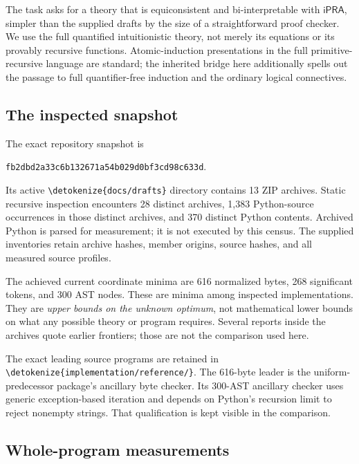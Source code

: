 \documentclass[11pt,letterpaper]{article}
\theoremstyle{definition}\newtheorem{definition}[theorem]{Definition}
\theoremstyle{remark}\newtheorem{remark}[theorem]{Remark}
\newcommand{\ipra}{\ensuremath{\mathsf{iPRA}}}
\newcommand{\file}[1]{\expandafter\nolinkurl\expandafter{\detokenize{#1}}}
\begin{document}
The task asks for a theory that is equiconsistent and bi-interpretable with
\ipra, simpler than the supplied drafts by the size of a straightforward
proof checker. We use the full quantified intuitionistic theory, not merely
its equations or its provably recursive functions. Atomic-induction
presentations in the full primitive-recursive language are standard;
the inherited bridge here additionally spells out the passage to full
quantifier-free induction and the ordinary logical connectives.\cite{salehi}

\subsection{The inspected snapshot}

The exact repository snapshot is
\begin{center}\small\texttt{fb2dbd2a33c6b132671a54b029d0bf3cd98c633d}.\end{center}
Its active \file{docs/drafts} directory contains 13 ZIP archives. Static
recursive inspection encounters 28 distinct archives, 1,383 Python-source
occurrences in those distinct archives, and 370 distinct Python contents.
Archived Python is parsed for measurement; it is not executed by this
census. The supplied inventories retain archive hashes, member origins,
source hashes, and all measured source profiles.\cite{corpus}

The achieved current coordinate minima are 616 normalized bytes, 268
significant tokens, and 300 AST nodes. These are minima among inspected
implementations. They are \emph{upper bounds on the unknown optimum}, not
mathematical lower bounds on what any possible theory or program requires.
Several reports inside the archives quote earlier frontiers; those are
not the comparison used here.

The exact leading source programs are retained in
\file{implementation/reference/}. The 616-byte leader is the uniform-
predecessor package's ancillary byte checker. Its 300-AST ancillary checker
uses generic exception-based iteration and depends on Python's recursion
limit to reject nonempty strings. That qualification is kept visible in
the comparison.\cite{uniform}

\subsection{Whole-program measurements}
\end{document}
